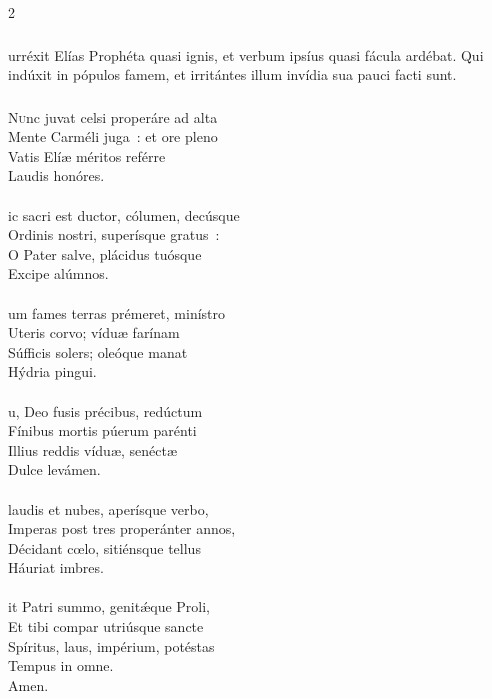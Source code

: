 \documentclass[9pt,twoside]{extarticle}
\begin{document}
\begin{multicols}{2}
{{{\subsubsection*{}
urréxit Elías Prophéta quasi ignis, et verbum ipsíus quasi fácula ardébat. Qui indúxit in pópulos famem, et irritántes illum invídia sua pauci facti sunt.

\subsubsection*{\center {}}
\lettrine{N}unc juvat celsi properáre ad alta\\
Mente Carméli juga~: et ore pleno\\
Vatis Elíæ méritos reférre\\
Laudis honóres.\\
\\
ic sacri est ductor, cólumen, decúsque\\
Ordinis nostri, superísque gratus~:\\
O Pater salve, plácidus tuósque\\
Excipe alúmnos.\\
\\
um fames terras prémeret, minístro\\
Uteris corvo; víduæ farínam\\
Súfficis solers; oleóque manat\\
Hýdria pingui.\\
\\
u, Deo fusis précibus, redúctum\\
Fínibus mortis púerum parénti\\
Illius reddis víduæ, senéctæ\\
Dulce levámen.\\
\\
laudis et nubes, aperísque verbo,\\
Imperas post tres properánter annos,\\
Décidant cœlo, sitiénsque tellus\\
Háuriat imbres.\\
\\
it Patri summo, genitǽque Proli,\\
Et tibi compar utriúsque sancte\\
Spíritus, laus, impérium, potéstas\\
Tempus in omne.\\
Amen.

}}}
\end{multicols}
\end{document}
